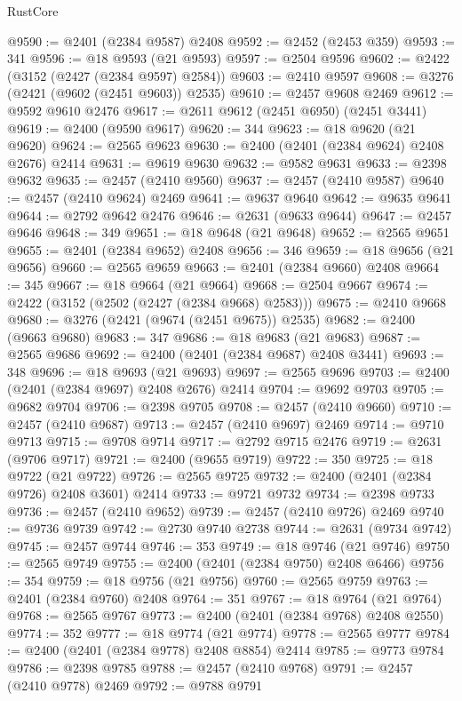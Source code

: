 \begin{lexlean}{RustCore}
\begin{coremodule}
@9590 := @2401 (@2384 @9587) @2408
@9592 := @2452 (@2453 @359)
@9593 := 341
@9596 := @18 @9593 (@21 @9593)
@9597 := @2504 @9596
@9602 := @2422 (@3152 (@2427 (@2384 @9597) @2584))
@9603 := @2410 @9597
@9608 := @3276 (@2421 (@9602 (@2451 @9603)) @2535)
@9610 := @2457 @9608 @2469
@9612 := @9592 @9610 @2476
@9617 := @2611 @9612 (@2451 @6950) (@2451 @3441)
@9619 := @2400 (@9590 @9617)
@9620 := 344
@9623 := @18 @9620 (@21 @9620)
@9624 := @2565 @9623
@9630 := @2400 (@2401 (@2384 @9624) @2408 @2676) @2414
@9631 := @9619 @9630
@9632 := @9582 @9631
@9633 := @2398 @9632
@9635 := @2457 (@2410 @9560)
@9637 := @2457 (@2410 @9587)
@9640 := @2457 (@2410 @9624) @2469
@9641 := @9637 @9640
@9642 := @9635 @9641
@9644 := @2792 @9642 @2476
@9646 := @2631 (@9633 @9644)
@9647 := @2457 @9646
@9648 := 349
@9651 := @18 @9648 (@21 @9648)
@9652 := @2565 @9651
@9655 := @2401 (@2384 @9652) @2408
@9656 := 346
@9659 := @18 @9656 (@21 @9656)
@9660 := @2565 @9659
@9663 := @2401 (@2384 @9660) @2408
@9664 := 345
@9667 := @18 @9664 (@21 @9664)
@9668 := @2504 @9667
@9674 := @2422 (@3152 (@2502 (@2427 (@2384 @9668) @2583)))
@9675 := @2410 @9668
@9680 := @3276 (@2421 (@9674 (@2451 @9675)) @2535)
@9682 := @2400 (@9663 @9680)
@9683 := 347
@9686 := @18 @9683 (@21 @9683)
@9687 := @2565 @9686
@9692 := @2400 (@2401 (@2384 @9687) @2408 @3441)
@9693 := 348
@9696 := @18 @9693 (@21 @9693)
@9697 := @2565 @9696
@9703 := @2400 (@2401 (@2384 @9697) @2408 @2676) @2414
@9704 := @9692 @9703
@9705 := @9682 @9704
@9706 := @2398 @9705
@9708 := @2457 (@2410 @9660)
@9710 := @2457 (@2410 @9687)
@9713 := @2457 (@2410 @9697) @2469
@9714 := @9710 @9713
@9715 := @9708 @9714
@9717 := @2792 @9715 @2476
@9719 := @2631 (@9706 @9717)
@9721 := @2400 (@9655 @9719)
@9722 := 350
@9725 := @18 @9722 (@21 @9722)
@9726 := @2565 @9725
@9732 := @2400 (@2401 (@2384 @9726) @2408 @3601) @2414
@9733 := @9721 @9732
@9734 := @2398 @9733
@9736 := @2457 (@2410 @9652)
@9739 := @2457 (@2410 @9726) @2469
@9740 := @9736 @9739
@9742 := @2730 @9740 @2738
@9744 := @2631 (@9734 @9742)
@9745 := @2457 @9744
@9746 := 353
@9749 := @18 @9746 (@21 @9746)
@9750 := @2565 @9749
@9755 := @2400 (@2401 (@2384 @9750) @2408 @6466)
@9756 := 354
@9759 := @18 @9756 (@21 @9756)
@9760 := @2565 @9759
@9763 := @2401 (@2384 @9760) @2408
@9764 := 351
@9767 := @18 @9764 (@21 @9764)
@9768 := @2565 @9767
@9773 := @2400 (@2401 (@2384 @9768) @2408 @2550)
@9774 := 352
@9777 := @18 @9774 (@21 @9774)
@9778 := @2565 @9777
@9784 := @2400 (@2401 (@2384 @9778) @2408 @8854) @2414
@9785 := @9773 @9784
@9786 := @2398 @9785
@9788 := @2457 (@2410 @9768)
@9791 := @2457 (@2410 @9778) @2469
@9792 := @9788 @9791

\end{coremodule}
\end{lexlean}
